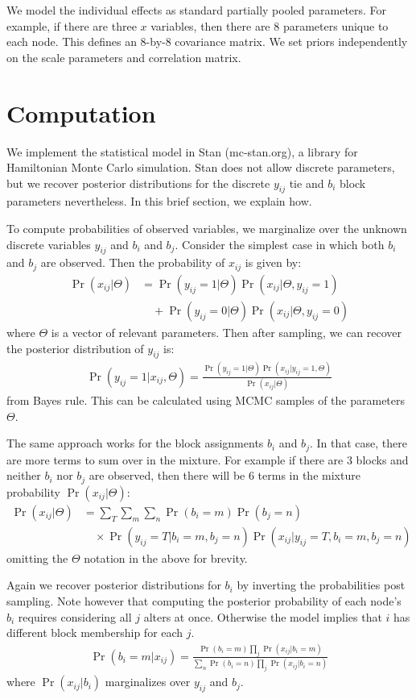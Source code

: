 \documentclass[reqno,12pt,a4paper]{amsart}
\begin{document}
We model the individual effects as standard partially pooled parameters. For example, if there are three $x$ variables, then there are 8 parameters unique to each node. This defines an 8-by-8 covariance matrix. We set priors independently on the scale parameters and correlation matrix.

\section{Computation}

We implement the statistical model in Stan (mc-stan.org), a library for Hamiltonian Monte Carlo simulation. Stan does not allow discrete parameters, but we recover posterior distributions for the discrete $y_{ij}$ tie and $b_i$ block parameters nevertheless. In this brief section, we explain how.

To compute probabilities of observed variables, we marginalize over the unknown discrete variables $y_{ij}$ and $b_i$ and $b_j$. Consider the simplest case in which both $b_i$ and $b_j$ are observed. Then the probability of $x_{ij}$ is given by:
\begin{align*}
	\Pr(x_{ij}|\Theta) &= \Pr(y_{ij}=1|\Theta)\Pr(x_{ij}|\Theta,y_{ij}=1) \\
	&\quad + \Pr(y_{ij}=0|\Theta)\Pr(x_{ij}|\Theta,y_{ij}=0)
\end{align*}
where $\Theta$ is a vector of relevant parameters. Then after sampling, we can recover the posterior distribution of $y_{ij}$ is:
\begin{align*}
	\Pr(y_{ij}=1|x_{ij},\Theta) = \frac{\Pr(y_{ij}=1|\Theta)\Pr(x_{ij}|y_{ij}=1,\Theta)}{\Pr(x_{ij}|\Theta)}
\end{align*}
from Bayes rule. This can be calculated using MCMC samples of the parameters $\Theta$.

The same approach works for the block assignments $b_i$ and $b_j$. In that case, there are more terms to sum over in the mixture. For example if there are 3 blocks and neither $b_i$ nor $b_j$ are observed, then there will be 6 terms in the mixture probability $\Pr(x_{ij}|\Theta)$:
\begin{align*}
	\Pr(x_{ij}|\Theta) &= \sum_T \sum_m \sum_n \Pr(b_i=m) \Pr(b_j=n) \\
	& \quad \times \Pr(y_{ij}=T|b_i=m,b_j=n)   \Pr(x_{ij}|y_{ij}=T,b_i=m,b_j=n)
\end{align*}
omitting the $\Theta$ notation in the above for brevity. 

Again we recover posterior distributions for $b_i$ by inverting the probabilities post sampling. Note however that computing the posterior probability of each node's $b_i$ requires considering all $j$ alters at once. Otherwise the model implies that $i$ has different block membership for each $j$.
\begin{align*}
	\Pr(b_i=m|x_{ij}) = \frac{ \Pr(b_i=m) \prod_j \Pr(x_{ij}|b_i=m) }{ \sum_n \Pr(b_i=n) \prod_j \Pr(x_{ij}|b_i=n) }
\end{align*}
where $\Pr(x_{ij}|b_i)$ marginalizes over $y_{ij}$ and $b_j$.
\end{document}
